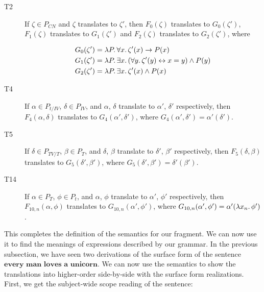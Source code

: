 \begin{description}
\item[T2] If $\zeta \in P_{CN}$ and $\zeta$ translates to $\zeta'$, then
  $F_0(\zeta)$ translates to $G_0(\zeta')$, $F_1(\zeta)$ translates to
  $G_1(\zeta')$ and $F_2(\zeta)$ translates to $G_2(\zeta')$, where

  \begin{align*}
    & G_0(\zeta') = \lambda P.\, \forall x.\, \zeta'(x) \to P(x) \\
    & G_1(\zeta') = \lambda P.\, \exists x.\, (\forall y.\, \zeta'(y) \leftrightarrow x
      = y) \land P(y) \\
    & G_2(\zeta') = \lambda P.\, \exists x.\, \zeta'(x) \land P(x)
  \end{align*}

\item[T4] If $\alpha \in P_{t / IV}$, $\delta \in P_{IV}$, and $\alpha$,
  $\delta$ translate to $\alpha'$, $\delta'$ respectively, then
  $F_4(\alpha, \delta)$ translates to $G_4(\alpha', \delta')$, where
  $G_4(\alpha', \delta') = \alpha'(\delta')$.

\item[T5] If $\delta \in P_{TV / T}$, $\beta \in P_{T}$, and $\delta$,
  $\beta$ translate to $\delta'$, $\beta'$ respectively, then
  $F_5(\delta, \beta)$ translates to $G_5(\delta', \beta')$, where
  $G_5(\delta', \beta') = \delta'(\beta')$.

\item[T14] If $\alpha \in P_T$, $\phi \in P_t$, and $\alpha$, $\phi$
  translate to $\alpha'$, $\phi'$ respectively, then
  $F_{10,n}(\alpha, \phi)$ translates to $G_{10,n}(\alpha', \phi')$, where
  $G_{10,n}(\alpha', \phi') = \alpha'(\lambda x_n.\, \phi')$.
\end{description}

This completes the definition of the semantics for our fragment. We can now
use it to find the meanings of expressions described by our grammar. In the
previous subsection, we have seen two derivations of the surface form of
the sentence $\textbf{every man loves a unicorn}$. We can now use the
semantics to show the translations into higher-order side-by-side with the
surface form realizations. First, we get the subject-wide scope reading of
the sentence:

